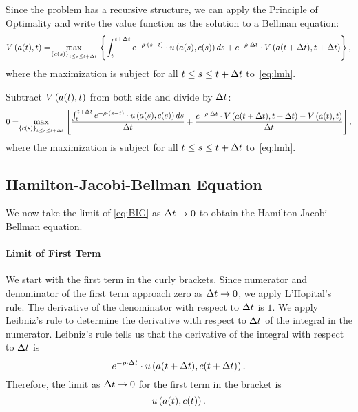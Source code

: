\documentclass[letterpaper,12pt,leqno]{article}
\begin{document}
Since the problem has a recursive structure, we can apply the Principle of Optimality and write the value function as the solution to a Bellman equation:
\begin{align*}
V\bp{ a(t),t} =\underset{\bc{c(s)}_{t\leq s\leq t+\D t}}{\max }\bc{\int_{t}^{t+\D t}e^{-\r \cdot \bp{ s-t}} \cdot u\bp{a(s),c(s)} ds+e^{-\r  \cdot \D t} \cdot V\bp{ a(t+\D t),t+\D t} },
\end{align*}
where the maximization is subject for all $t\leq s\leq t+\Delta t$ to~\eqref{eq:lmh}.

Subtract $V\left( a(t),t \right) $ from both side and divide by $\Delta t$:
\begin{align}
0=\underset{\bc{c(s)}_{t\leq s\leq t+\D t}}{\max }\bs{\frac{\int_{t}^{t+\D t}e^{-\r \cdot \bp{ s-t}} \cdot u\bp{a(s),c(s)} ds}{\D t}+ \frac{e^{-\r  \cdot \D t} \cdot V\bp{ a(t+\D t),t+\D t}-V\bp{ a(t),t}}{\D t} },\label{eq:BIG}
\end{align}
where the maximization is subject for all $t\leq s\leq t+\Delta t$ to~\eqref{eq:lmh}.

\subsection{Hamilton-Jacobi-Bellman Equation}

We now take the limit of \eqref{eq:BIG} as $\Delta t\to 0$ to obtain the Hamilton-Jacobi-Bellman equation.

\paragraph{Limit of First Term} We start with the first term in the curly brackets. Since numerator and denominator of the first term approach zero as $\Delta t\to 0$,  we apply L'Hopital's rule. The derivative of the denominator with respect to $\Delta t$ is $1$. We apply Leibniz's rule to determine the derivative with respect to $\Delta t$ of the integral in the numerator. Leibniz's rule tells us that the derivative of the integral with respect to $\Delta t$ is
\[e^{-\rho \cdot  \Delta t} \cdot u\left( a(t+\Delta t),c(t+\Delta t) \right).\]
Therefore, the limit as $\Delta t\to 0$ for the first term in the bracket is 
\begin{equation}
u\left(  a(t),c(t) \right).\label{eq:BIG1}
\end{equation}
\end{document}
